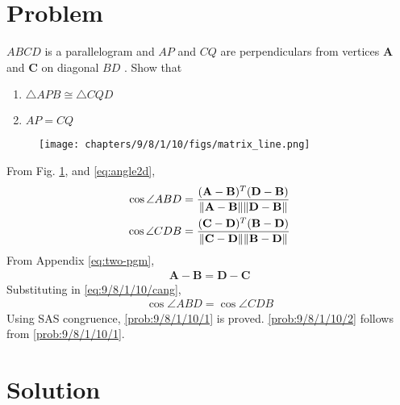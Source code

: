 \documentclass[10pt, a4paper]{article}
\title{\mytitle}
\author{\myauthor\hspace{1em}\\\contact\\FWC22012\hspace{6.5em}IITH\hspace{0.5em}\mymodule\hspace{6em}ASSIGN-5}
\date{}
\let\vec\mathbf
\begin{document}
	\maketitle
	\tableofcontents
   \section{Problem}
   \fi
  $ABCD$ is a parallelogram and $AP$ and $CQ$ are
perpendiculars from vertices $\vec{A}$ and $\vec{C}$ on diagonal
$BD$ . Show that 
\begin{enumerate}
	\item  $\triangle APB \cong \triangle CQD$   
		\label{prob:9/8/1/10/1}
	\item  $AP = CQ$
		\label{prob:9/8/1/10/2}
\end{enumerate}

 	\begin{figure}
		\centering
 \texttt{[image: chapters/9/8/1/10/figs/matrix\_line.png]}
		\caption{}
		\label{fig:9/8/1/10}
  	\end{figure}
\solution From Fig. 
		\ref{fig:9/8/1/10},
		and 
    \eqref{eq:angle2d},
\begin{align}
		\begin{split}
	\cos \angle{ABD}
	&= \frac{(\vec{A}-\vec{B})^T(\vec{D}-\vec{B})}{\norm{\vec{A}-\vec{B}}\norm{\vec{D}-\vec{B}}}
	\\
\cos	\angle{CDB}
	 &= \frac{(\vec{C}-\vec{D})^T(\vec{B}-\vec{D})}{\norm{\vec{C}-\vec{D}}\norm{\vec{B}-\vec{D}}}
		\end{split}
	 \label{eq:9/8/1/10/cang}
%
\end{align}
From Appendix 
	  \ref{eq:two-pgm}, 
\begin{align}
\vec{A}
-
\vec{B}
=
	\vec{D}
-\vec{C}
\end{align}
Substituting in 
	 \eqref{eq:9/8/1/10/cang},
\begin{align}
	\cos \angle{ABD}
	=\cos \angle{CDB}
\end{align}
Using SAS congruence, 
		\ref{prob:9/8/1/10/1}  is proved. \ref{prob:9/8/1/10/2} follows from 
\ref{prob:9/8/1/10/1}.
\iffalse

   \section{Solution}
\end{document}
